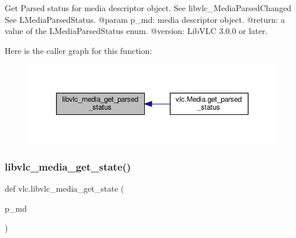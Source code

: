 \begin{DoxyVerb}Get Parsed status for media descriptor object.
See libvlc_MediaParsedChanged
See L{MediaParsedStatus}.
@param p_md: media descriptor object.
@return: a value of the L{MediaParsedStatus} enum.
@version: LibVLC 3.0.0 or later.
\end{DoxyVerb}
 Here is the caller graph for this function\+:
\nopagebreak
\begin{figure}[H]
\begin{center}
\leavevmode
\includegraphics[width=350pt]{namespacevlc_a54f57e0bca8341f88e32cc2eb5b2b419_icgraph}
\end{center}
\end{figure}
\mbox{\label{namespacevlc_a08910af5cb2ffede600654c5a567ab85}} 
\subsubsection{\texorpdfstring{libvlc\+\_\+media\+\_\+get\+\_\+state()}{libvlc\_media\_get\_state()}}
{\footnotesize\ttfamily def vlc.\+libvlc\+\_\+media\+\_\+get\+\_\+state (\begin{DoxyParamCaption}\item[{}]{p\+\_\+md }\end{DoxyParamCaption})}

